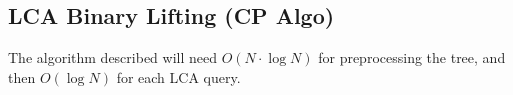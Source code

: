 \subsection{LCA Binary Lifting (CP Algo)}

The algorithm described will need $O(N \cdot \log N)$ for preprocessing the tree, and then $O(\log N)$ for each LCA query.
